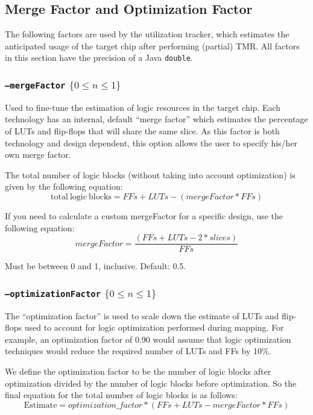 \documentclass[english]{article}
\begin{document}
\subsection{Merge Factor and Optimization Factor}
The following factors are used by the utilization tracker, which estimates the 
anticipated usage of the target chip after performing (partial) TMR\@. All factors
in this section have the precision of a Java \texttt{double}. 

\subsubsection{\texttt{--mergeFactor} $\{ 0 \leq n \leq 1 \}$ }
Used to fine-tune the estimation of logic resources in the target chip. Each 
technology has an internal, default ``merge factor'' which estimates the 
percentage of LUTs and flip-flops that will share the same slice. As this 
factor is both technology and design dependent, this option allows the user to 
specify his/her own merge factor. 

The total number of logic blocks (without taking into account optimization) is 
given by the following equation:
\begin{equation*}
\mathrm{total~logic~blocks} = FFs + LUTs - (mergeFactor * FFs)
\end{equation*}

If you need to calculate a custom mergeFactor for a specific design, use the 
following equation:
\begin{equation*}
mergeFactor = \frac{(FFs + LUTs - 2 * slices)}{FFs}
\end{equation*}

Must be between 0 and 1, inclusive. Default: 0.5.

\subsubsection{\texttt{--optimizationFactor} $\{ 0 \leq n \leq 1 \}$}
The ``optimization factor'' is used to scale down the estimate of LUTs and 
flip-flops used to account for logic optimization performed during mapping. For 
example, an optimization factor of 0.90 would assume that logic optimization 
techniques would reduce the required number of LUTs and FFs by 10\%.

We define the optimization factor to be the number of logic blocks after 
optimization divided by the number of logic blocks before optimization.  So the 
final equation for the total number of logic blocks is as follows:
\begin{equation*}
\mathrm{Estimate} = optimization\_factor * (FFs + LUTs -  mergeFactor * FFs)
\end{equation*}
\end{document}
